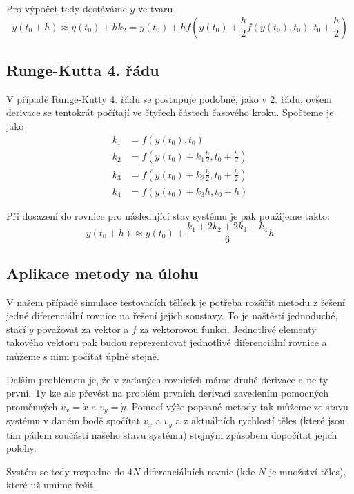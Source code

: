 \documentclass[a4paper,11pt]{article}
\begin{document}
Pro výpočet tedy dostáváme $y$ ve tvaru
\begin{equation*}
    y(t_0 + h) \approx y(t_0) + h k_2 = y(t_0) + h f\left(y(t_0) + \frac{h}{2} f(y(t_0), t_0), t_0 + \frac{h}{2}\right)
\end{equation*}

\subsection{Runge-Kutta 4. řádu}

V případě Runge-Kutty 4. řádu se postupuje podobně, jako v 2. řádu, ovšem derivace se tentokrát počítají ve čtyřech částech
časového kroku. Spočteme je jako
\begin{align*}
    k_1 &= f(y(t_0), t_0) \\
    k_2 &= f(y(t_0) + k_1 \frac{h}{2}, t_0 + \frac{h}{2}) \\
    k_3 &= f(y(t_0) + k_2 \frac{h}{2}, t_0 + \frac{h}{2}) \\
    k_4 &= f(y(t_0) + k_3 h, t_0 + h)
\end{align*}

Při dosazení do rovnice pro následující stav systému je pak použijeme takto:
\begin{equation*}
    y(t_0 + h) \approx y(t_0) + \frac{k_1 + 2k_2 + 2k_3 + k_4}{6} h
\end{equation*}

\subsection{Aplikace metody na úlohu}

V našem případě simulace testovacích tělísek je potřeba rozšířit metodu z řešení jedné diferenciální
rovnice na řešení jejich soustavy. To je naštěstí jednoduché, stačí $y$ považovat za vektor a $f$ za
vektorovou funkci. Jednotlivé elementy takového vektoru pak budou reprezentovat jednotlivé diferenciální rovnice
a můžeme s nimi počítat úplně stejně.

Dalším problémem je, že v zadaných rovnicích máme druhé derivace a ne ty první. Ty lze ale převést na problém
prvních derivací zavedením pomocných proměnných $v_x = \dot{x}$ a $v_y = \dot{y}$. Pomocí výše popsané metody
tak můžeme ze stavu systému v daném bodě spočítat $v_x$ a $v_y$ a z aktuálních rychlostí těles (které jsou tím 
pádem součástí našeho stavu systému) stejným způsobem dopočítat jejich polohy.

Systém se tedy rozpadne do $4N$ diferenciálních rovnic (kde $N$ je množství těles), které už umíme řešit.
\end{document}
